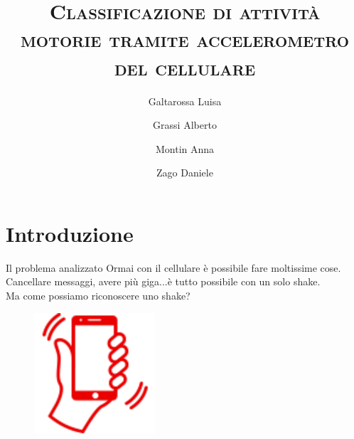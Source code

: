 \documentclass{beamer}
\title{\textsc{Classificazione di attività motorie tramite accelerometro del cellulare}}
\author{Galtarossa Luisa\and Grassi Alberto\and Montin Anna\and Zago Daniele}
\date{}
\begin{document}
\begin{frame}
\titlepage
\end{frame}

\section{Introduzione}
\begin{frame}{Il problema analizzato}
Ormai con il cellulare è possibile fare moltissime cose. 
Cancellare messaggi, avere più giga...è tutto possibile con un solo shake.\\
\smallskip
Ma come possiamo riconoscere uno shake?
\begin{figure}[H]
\includegraphics[width=0.4\textwidth]{./images/vodafoneshake.png}
\end{figure}
\end{frame}
\end{document}
